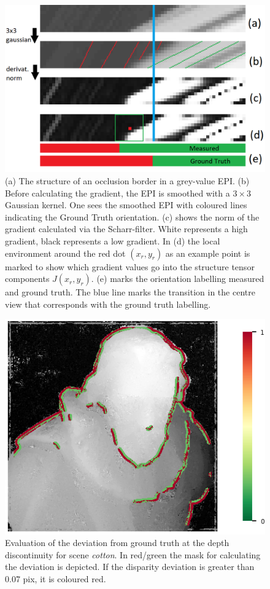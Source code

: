 \documentclass  [
  paper    = a4,
  BCOR     = 10mm,
  twoside,
  fontsize = 12pt,
  fleqn,
  toc      = bibnumbered,
  toc      = listofnumbered,
  numbers  = noendperiod,
  headings = normal,
  listof   = leveldown,
  version  = 3.03
]                                       {scrreprt}
\begin{document}
  \begin{figure}[h!]
  	\centering
  	\includegraphics[width=0.7\linewidth]{images/occlusion_painted2}
  	\caption[Occlusion in an EPI]{(a) The structure of an occlusion border in a grey-value EPI. (b) Before calculating the gradient, the EPI is smoothed with a $3 \times 3$ Gaussian kernel. One sees the smoothed EPI with coloured lines indicating the Ground Truth orientation. (c) shows the norm of the gradient calculated via the Scharr-filter. White represents a high gradient, black represents a low gradient. In (d) the local environment around the red dot $(x_r,y_r)$ as an example point is marked to show which gradient values go into the structure tensor components $J(x_r,y_r)$. (e) marks the orientation labelling measured and ground truth. The blue line marks the transition in the centre view that corresponds with the ground truth labelling. }
  	\label{fig:occlusion}
  \end{figure}
\begin{figure}[h!]
	\centering
	\includegraphics[width=0.7\linewidth]{images/cotton_discontinuities_0070}
	\caption[Discontinuity evaluation]{Evaluation of the deviation from ground truth at the depth discontinuity for scene \textit{cotton}. In red/green the mask for calculating the deviation is depicted. If the disparity deviation is greater than 0.07 pix, it is coloured red.}
	\label{fig:cottondiscontinuities0070}
\end{figure}
  
\end{document}
